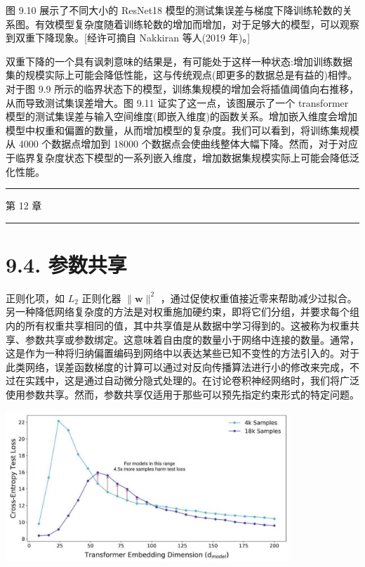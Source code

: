 \documentclass[10pt]{article}
\newcommand{\HRule}{\begin{center}\rule{0.9\linewidth}{0.2mm}\end{center}}
\begin{document}
图 9.10 展示了不同大小的 ResNet18 模型的测试集误差与梯度下降训练轮数的关系图。有效模型复杂度随着训练轮数的增加而增加，对于足够大的模型，可以观察到双重下降现象。[经许可摘自 Nakkiran 等人(2019 年)。]

双重下降的一个具有讽刺意味的结果是，有可能处于这样一种状态:增加训练数据集的规模实际上可能会降低性能，这与传统观点(即更多的数据总是有益的)相悖。对于图 9.9 所示的临界状态下的模型，训练集规模的增加会将插值阈值向右推移，从而导致测试集误差增大。图 9.11 证实了这一点，该图展示了一个 transformer 模型的测试集误差与输入空间维度(即嵌入维度)的函数关系。增加嵌入维度会增加模型中权重和偏置的数量，从而增加模型的复杂度。我们可以看到，将训练集规模从 4000 个数据点增加到 18000 个数据点会使曲线整体大幅下降。然而，对于对应于临界复杂度状态下模型的一系列嵌入维度，增加数据集规模实际上可能会降低泛化性能。

\HRule

第 12 章

\HRule

\section*{9.4. 参数共享}

正则化项，如 \({L}_{2}\) 正则化器 \(\parallel \mathbf{w}{\parallel }^{2}\) ，通过促使权重值接近零来帮助减少过拟合。另一种降低网络复杂度的方法是对权重施加硬约束，即将它们分组，并要求每个组内的所有权重共享相同的值，其中共享值是从数据中学习得到的。这被称为权重共享、参数共享或参数绑定。这意味着自由度的数量小于网络中连接的数量。通常，这是作为一种将归纳偏置编码到网络中以表达某些已知不变性的方法引入的。对于此类网络，误差函数梯度的计算可以通过对反向传播算法进行小的修改来完成，不过在实践中，这是通过自动微分隐式处理的。在讨论卷积神经网络时，我们将广泛使用参数共享。然而，参数共享仅适用于那些可以预先指定约束形式的特定问题。

\begin{center}
\includegraphics[max width=0.8\textwidth]{images/0194e279-9b28-703a-88f4-c3ac21e2010d_290_383_371_1020_540_0.jpg}
\end{center}
\hspace*{3em} 
\end{document}
